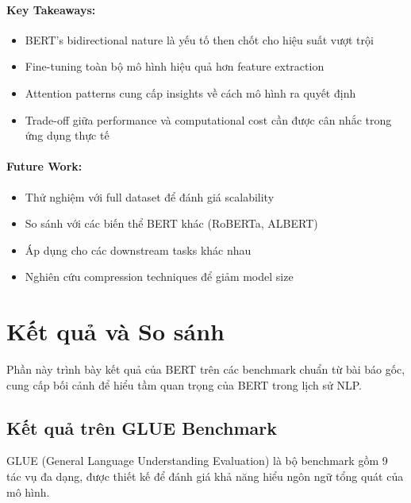 \paragraph{Key Takeaways:}
\begin{itemize}
    \item BERT's bidirectional nature là yếu tố then chốt cho hiệu suất vượt trội
    \item Fine-tuning toàn bộ mô hình hiệu quả hơn feature extraction
    \item Attention patterns cung cấp insights về cách mô hình ra quyết định
    \item Trade-off giữa performance và computational cost cần được cân nhắc trong ứng dụng thực tế
\end{itemize}

\paragraph{Future Work:}
\begin{itemize}
    \item Thử nghiệm với full dataset để đánh giá scalability
    \item So sánh với các biến thể BERT khác (RoBERTa, ALBERT)
    \item Áp dụng cho các downstream tasks khác nhau
    \item Nghiên cứu compression techniques để giảm model size
\end{itemize}

\section{Kết quả và So sánh}
\label{sec:ket_qua_so_sanh}
Phần này trình bày kết quả của BERT trên các benchmark chuẩn từ bài báo gốc, cung cấp bối cảnh để hiểu tầm quan trọng của BERT trong lịch sử NLP.

\subsection{Kết quả trên GLUE Benchmark}
\label{ssec:ket_qua_glue}
GLUE (General Language Understanding Evaluation) là bộ benchmark gồm 9 tác vụ đa dạng, được thiết kế để đánh giá khả năng hiểu ngôn ngữ tổng quát của mô hình.

